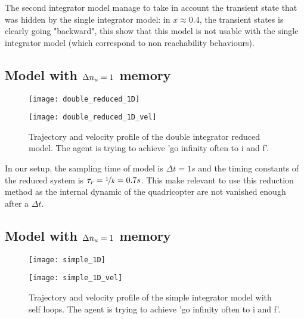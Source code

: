 
The second integrator model manage to take in account the transient state that was hidden by the single integrator model: in $x\approx0.4$, the transient states is clearly going "backward", this show that this model is not usable with the single integrator model (which correspond to non reachability behaviours).

\subsection{Model with $\Delta n_u= 1$ memory}
\begin{figure}[!ht]
	\begin{minipage}[b]{0.5\textwidth}
  		\centering
  		\texttt{[image: double\_reduced\_1D]}
	  	\label{double_reduced_1D}
  \end{minipage}
	\begin{minipage}[b]{0.5\textwidth}
  		\centering
  		\texttt{[image: double\_reduced\_1D\_vel]}
	  	\label{double_reduced_1D_vel}
  \end{minipage}
  \caption{Trajectory and velocity profile of the double integrator reduced model. The agent is trying to achieve 'go infinity often to i and f'.}
\end{figure}

In our setup, the sampling time of model is ${\Delta t = 1s}$ and the timing constants of the reduced system is $\tau_r = {\nicefrac{1}{k} = 0.7s}$. This make relevant to use this reduction method as the internal dynamic of the quadricopter are not vanished enough after a $\Delta t$.


\subsection{Model with $\Delta n_u= 1$ memory} \label{sec:single_int}
\begin{figure}[!ht]
	\begin{minipage}[b]{0.5\textwidth}
  		\centering
  		\texttt{[image: simple\_1D]}
	  	\label{simple_1D}
  \end{minipage}
	\begin{minipage}[b]{0.5\textwidth}
  		\centering
  		\texttt{[image: simple\_1D\_vel]}
	  	\label{simple_1D_vel}
  \end{minipage}
  \caption{Trajectory and velocity profile of the simple integrator model with self loops. The agent is trying to achieve 'go infinity often to i and f'.}
\end{figure}

